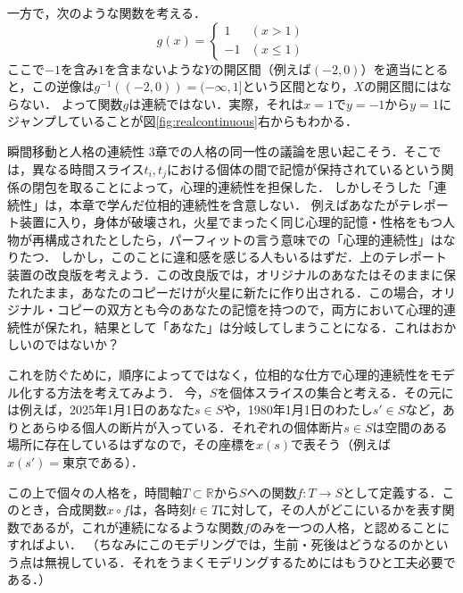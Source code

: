 \documentclass[11pt,a4paper, dvipdfmx]{jsarticle}
\begin{document}
一方で，次のような関数を考える．
\[
g(x) = \left\{
\begin{array}{ll}
1 & (x > 1)\\
-1 & (x \leq 1)
\end{array}
\right. 
\]
ここで$-1$を含み$1$を含まないような$Y$の開区間（例えば$(-2, 0)$）を適当にとると，この逆像は$g^{-1}((-2, 0)) = (-\infty, 1]$という区間となり，$X$の開区間にはならない．
よって関数$g$は連続ではない．実際，それは$x=1$で$y=-1$から$y=1$にジャンプしていることが図\ref{fig:realcontinuous}右からもわかる．

\begin{rei}{瞬間移動と人格の連続性}{}
  3章での人格の同一性の議論を思い起こそう．そこでは，異なる時間スライス$t_i, t_j$における個体の間で記憶が保持されているという関係の閉包を取ることによって，心理的連続性を担保した．
  しかしそうした「連続性」は，本章で学んだ位相的連続性を含意しない．
  例えばあなたがテレポート装置に入り，身体が破壊され，火星でまったく同じ心理的記憶・性格をもつ人物が再構成されたとしたら，パーフィットの言う意味での「心理的連続性」はなりたつ．
  しかし，このことに違和感を感じる人もいるはずだ．上のテレポート装置の改良版を考えよう．この改良版では，オリジナルのあなたはそのままに保たれたまま，あなたのコピーだけが火星に新たに作り出される．この場合，オリジナル・コピーの双方とも今のあなたの記憶を持つので，両方において心理的連続性が保たれ，結果として「あなた」は分岐してしまうことになる．これはおかしいのではないか？

  これを防ぐために，順序によってではなく，位相的な仕方で心理的連続性をモデル化する方法を考えてみよう．
  今，$S$を個体スライスの集合と考える．その元には例えば，2025年1月1日のあなた$s \in S$や，1980年1月1日のわたし$s' \in S$など，ありとあらゆる個人の断片が入っている．それぞれの個体断片$s \in S$は空間のある場所に存在しているはずなので，その座標を$x(s)$で表そう（例えば$x(s') = \text{東京}$である）．
  
  この上で個々の人格を，時間軸$T \subset \mathbb{R}$から$S$への関数$f: T \to S$として定義する．このとき，合成関数$x \circ f$は，各時刻$t \in T$に対して，その人がどこにいるかを表す関数であるが，これが連続になるような関数$f$のみを一つの人格，と認めることにすればよい．
  （ちなみにこのモデリングでは，生前・死後はどうなるのかという点は無視している．それをうまくモデリングするためにはもうひと工夫必要である．）
\end{rei}
\end{document}
